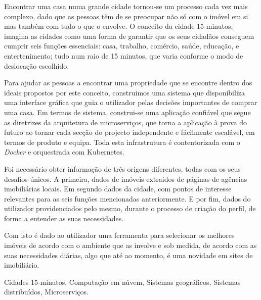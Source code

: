 \abstractPT  %

Encontrar uma casa numa grande cidade tornou-se um processo cada vez mais complexo, dado que as pessoas têm de se preocupar não só com o imóvel em si mas também com tudo o que o envolve. O conceito da cidade 15-minutos, imagina as cidades como uma forma de garantir que os seus cidadãos conseguem cumprir seis funções essenciais: casa, trabalho, comércio, saúde, educação, e entertenimento; tudo num raio de 15 minutos, que varia conforme o modo de deslocação escolhido.

Para ajudar as pessoas a encontrar uma propriedade que se encontre dentro dos ideais propostos por este conceito, construimos uma sistema que disponibiliza uma interface gráfica que guia o utilizador pelas decisões importantes de comprar uma casa. Em termos de sistema, construi-se uma aplicação confiável que segue as diretrizes da arquitetura de microserviços, que torna a aplicação à prova do futuro ao tornar cada secção do projecto independente e fácilmente escalável, em termos de produto e equipa. Toda esta infrastrutura é contentorizada com o \textit{Docker} e orquestrada com Kubernetes.

Foi necessário obter informação de três origens diferentes, todas com os seus desafios únicos. A primeira, dados de imóveis extraidos de páginas de agências imobiliárias locais. Em segundo dados da cidade, com pontos de interesse relevantes para as seis funções mencionadas anteriormente. E por fim, dados do utilizador providenciados pelo mesmo, durante o processo de criação do perfil, de forma a entender as suas necessidades.

Com isto é dado ao utilizador uma ferramenta para selecionar os melhores imóveis de acordo com o ambiente que as involve e sob medida, de acordo com as suas necessidades diárias, algo que até ao momento, é uma novidade em sites de imobiliário.

\begin{keywords}
Cidades 15-minutos, Computação em núvem, Sistemas geográficos, Sistemas distribuídos, Microserviços.
\end{keywords}
